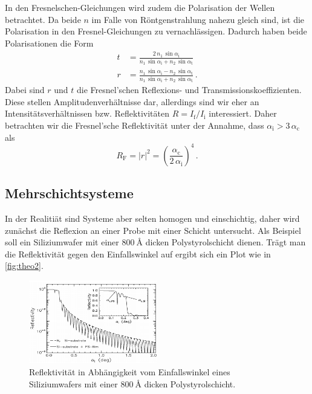 In den Fresnelschen-Gleichungen wird zudem die Polarisation der Wellen betrachtet.
Da beide $n$ im Falle von Röntgenstrahlung nahezu gleich sind, ist die Polarisation in den Fresnel-Gleichungen zu vernachlässigen.
Dadurch haben beide Polarisationen die Form
\begin{align}
    t &= \frac{2 \, n_1 \, \sin{\alpha _\text{i}} }{n_1 \, \sin{\alpha _\text{i}} + n_2 \, \sin{\alpha _\text{t}}} \\
    r &= \frac{n_1 \, \sin{\alpha _\text{i}} - n_2 \, \sin{\alpha _\text{t}}}{n_1 \, \sin{\alpha _\text{i}} + n_2 \, \sin{\alpha _\text{t}}} \,.
\end{align}
Dabei sind $r$ und $t$ die Fresnel'schen Reflexions- und Transmissionskoeffizienten. 
Diese stellen Amplitudenverhältnisse dar, allerdings sind wir eher an Intensitätsverhältnissen bzw. Reflektivitäten $R = I_\text{f} / I_\text{i}$ interessiert.
Daher betrachten wir die Fresnel'sche Reflektivität unter der Annahme, dass $\alpha _\text{i} > 3 \, \alpha _\text{c}$ als 
\begin{equation}
    R_\text{F} = |r|^2 = \left( \frac{{\alpha _\text{c}}}{2 \, \alpha _\text{i}}  \right)^4 \,.
    \label{eq:reflek}
\end{equation}

\subsection{Mehrschichtsysteme}
\label{theo2}

In der Realitiät sind Systeme aber selten homogen und einschichtig, daher wird zunächst die Reflexion an einer Probe mit einer Schicht untersucht.
Als Beispiel soll ein Siliziumwafer mit einer $\SI{800}{\angstrom}$ dicken Polystyrolschicht dienen. 
Trägt man die Reflektivität gegen den Einfallswinkel auf ergibt sich ein Plot wie in \autoref{fig:theo2}.

\begin{figure}
    \centering
    \includegraphics[width=0.5\textwidth]{images/plot.png}
    \caption{Reflektivität in Abhängigkeit vom Einfallswinkel eines Siliziumwafers mit einer $\SI{800}{\angstrom}$ dicken Polystyrolschicht. \cite{V44old}}
    \label{fig:theo2}
\end{figure}

